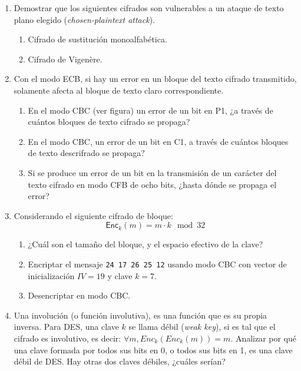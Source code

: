 \documentclass[]{book}
\theoremstyle{definition}
\begin{document}
\begin{enumerate}
\item Demostrar que los siguientes cifrados son vulnerables a un ataque de texto plano elegido (\textit{chosen-plaintext attack}).
\begin{enumerate}
  \item Cifrado de sustitución monoalfabética.
  \item Cifrado de Vigenère.
\end{enumerate}
\item Con el modo ECB, si hay un error en un bloque del texto cifrado transmitido, solamente afecta al bloque de texto claro correspondiente.
\begin{enumerate}
\item En el modo CBC (ver figura) un error de un bit en P1, ¿a través de cuántos bloques de texto cifrado se propaga?
\item En el modo CBC, un error de un bit en C1, a través de cuántos bloques de texto descrifrado se propaga?
\item Si se produce un error de un bit en la transmisión de un carácter del texto cifrado en modo CFB de ocho bits, ¿hasta dónde se propaga el error?
\end{enumerate}
\item Considerando el siguiente cifrado de bloque:
  \[\mathsf{Enc}_k(m) = m \cdot k \mod 32\]
\begin{enumerate}
\item ¿Cuál son el tamaño del bloque, y el espacio efectivo de la clave?
\item Encriptar el mensaje \verb+24 17 26 25 12+ usando modo CBC con vector de
  inicialización $IV = 19$ y clave $k = 7$.
\item Desencriptar en modo CBC.
\end{enumerate}

\item Una involución (o función involutiva), es una función que es su propia
  inversa. Para DES, una clave $k$ se llama débil (\textit{weak key}), si es tal que
  el cifrado es involutivo, es decir: $\forall m, Enc_k(Enc_k(m)) = m$. Analizar
  por qué una clave formada por todos sus bits en 0, o todos sus bits en 1, es
  una clave débil de DES. Hay otras dos claves débiles, ¿cuáles serían?
\end{enumerate}
\end{document}
